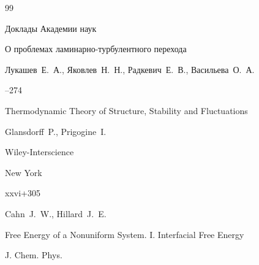 \begin{thebibliography}{99}




%








\jour Доклады Академии наук

\paper О проблемах ламинарно-турбулентного перехода

\by Лукашев~Е.~А., Яковлев~Н.~Н., Радкевич~Е.~В., Васильева~О.~А.




--274











\book Thermodynamic Theory of Structure, Stability and Fluctuations

\by  Glansdorff~P.,  Prigogine~I.

\publ Wiley-Interscience

\publaddr New York


\totalpages xxvi+305






\by Cahn~J.~W., Hillard~J.~E.

\paper Free Energy of a Nonuniform System. I. Interfacial Free Energy

\jour J. Chem. Phys.




\end{thebibliography}
